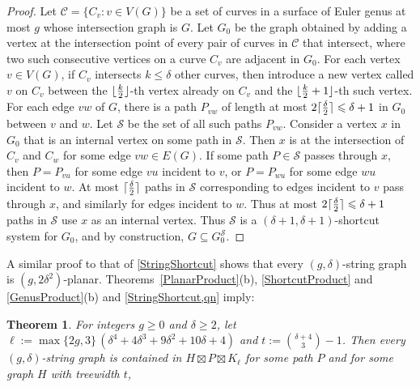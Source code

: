 \documentclass{patmorin}
\theoremstyle{plain}
\newtheorem{thm}{Theorem}
\theoremstyle{definition}
\DeclareMathOperator{\qn}{qn}
\DeclarePairedDelimiter{\ceil}{\lceil}{\rceil}
\DeclarePairedDelimiter{\floor}{\lfloor}{\rfloor}
\renewcommand{\SS}{\mathcal{S}}
\renewcommand{\geq}{\geqslant}
\renewcommand{\leq}{\leqslant}
\begin{document}
\begin{proof}
Let $\mathcal{C}=\{C_v:v\in V(G)\}$ be a set of curves in a surface of Euler genus at most $g$ whose intersection graph is $G$.  Let $G_0$ be the graph obtained by adding a vertex at the intersection point of every pair of curves in $\mathcal{C}$ that intersect,  where two such consecutive vertices on a curve $C_v$ are adjacent in $G_0$. For each vertex $v\in V(G)$, if $C_v$ intersects $k\leq\delta$ other curves, then introduce a new vertex called $v$ on $C_v$ between the
$\floor{\frac{k}{2}}$-th vertex already on $C_v$ and the $\floor{\frac{k}{2}+1}$-th such vertex. For each edge $vw$ of $G$, there is a path $P_{vw}$ of length at most $2\ceil{\frac{\delta}{2}}\leq \delta+1$ in $G_0$ between $v$ and $w$. Let $\SS$ be the set of all such paths $P_{vw}$. Consider a vertex $x$ in $G_0$ that is an internal vertex on some path in $\SS$. Then $x$ is at the intersection of $C_v$ and $C_w$ for some edge $vw\in E(G)$. If some path $P\in \SS$ passes through $x$, then $P=P_{vu}$ for some edge $vu$ incident to $v$, or $P=P_{wu}$ for some edge $wu$ incident to $w$. At most $\ceil{\frac{\delta}{2}}$ paths in $\SS$ corresponding to edges incident to $v$ pass through $x$, and similarly for edges incident to $w$. Thus at most $2\ceil{\frac{\delta}{2}}\leq\delta+1$ paths in $\SS$ use $x$ as an internal vertex. Thus $\SS$ is a $(\delta+1,\delta+1)$-shortcut system for $G_0$, and by construction, $G \subseteq G_0^\SS$.
\end{proof}

A similar proof to that of \cref{StringShortcut} shows that every $(g,\delta)$-string graph is $(g,2\delta^2)$-planar. Theorems~\ref{PlanarProduct}(b), \ref{ShortcutProduct}  and \ref{GenusProduct}(b) and \cref{StringShortcut,qn} imply:

\begin{thm}\label{StringPartition}
For integers $g\geq 0$ and $\delta\geq 2$, let $\ell:= \max\{2g,3\} \,(\delta^4 + 4 \delta^3 + 9 \delta^2 + 10 \delta + 4)$ and $t:= \binom{ \delta+4}{3}-1$.
Then  every $(g,\delta)$-string graph is contained in $H\boxtimes P \boxtimes K_{\ell}$ for some path $P$ and for some graph $H$ with treewidth $t$,
\end{thm}


\end{document}
